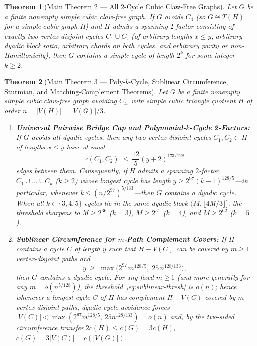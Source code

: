 \documentclass[11pt,reqno]{amsart}
\theoremstyle{plain}
\newtheorem{theorem}{Theorem}[section]
\theoremstyle{definition}
\theoremstyle{remark}
\DeclareRobustCommand{\_}{\ifmmode\text{\textunderscore}\else\textunderscore\allowbreak\fi}
\begin{document}
\begin{theorem}[Main Theorem 2 --- All 2-Cycle Cubic Claw-Free Graphs]\label{thm:main2}
Let $G$ be a finite nonempty simple cubic claw-free graph. If $G$ avoids $C_4$ (so $G \cong T(H)$ for a simple cubic graph $H$) and $H$ admits a spanning $2$-factor consisting of exactly two vertex-disjoint cycles $C_1 \cup C_2$ (of arbitrary lengths $x \le y$, arbitrary dyadic block ratio, arbitrary chords on both cycles, and arbitrary parity or non-Hamiltonicity), then $G$ contains a simple cycle of length $2^k$ for some integer $k \ge 2$.
\end{theorem}

\begin{theorem}[Main Theorem 3 --- Poly-$k$-Cycle, Sublinear Circumference, Sturmian, and Matching-Complement Theorems]\label{thm:main3}
Let $G$ be a finite nonempty simple cubic claw-free graph avoiding $C_4$, with simple cubic triangle quotient $H$ of order $n = |V(H)| = |V(G)|/3$.
\begin{enumerate}[label=(\alph*),leftmargin=2.2em]
  \item \textbf{Universal Pairwise Bridge Cap and Polynomial-$k$-Cycle 2-Factors:} If $G$ avoids all dyadic cycles, then any two vertex-disjoint cycles $C_1, C_2 \subset H$ of lengths $x \le y$ have at most
  \[
    r(C_1, C_2) \;\le\; \frac{12}{5}(y + 2)^{123/128}
  \]
  edges between them. Consequently, if $H$ admits a spanning $2$-factor $C_1 \cup \dots \cup C_k$ ($k \ge 2$) whose longest cycle has length $y \ge 2^{97}(k - 1)^{128/5}$---in particular, whenever $k \le (n/2^{97})^{5/133}$---then $G$ contains a dyadic cycle. When all $k \in \{3, 4, 5\}$ cycles lie in the same dyadic block $(M, \lfloor 4M/3 \rfloor]$, the threshold sharpens to $M \ge 2^{36}$ ($k = 3$), $M \ge 2^{51}$ ($k = 4$), and $M \ge 2^{62}$ ($k = 5$).
  \item \textbf{Sublinear Circumference for $m$-Path Complement Covers:} If $H$ contains a cycle $C$ of length $y$ such that $H - V(C)$ can be covered by $m \ge 1$ vertex-disjoint paths and
  \begin{equation}\label{eq:sublinear-thresh}
    y \;\ge\; \max\!\bigl(2^{97}\, m^{128/5},\; 25\, n^{128/133}\bigr),
  \end{equation}
  then $G$ contains a dyadic cycle. For any fixed $m \ge 1$ (and more generally for any $m = o(n^{5/128})$), the threshold~\eqref{eq:sublinear-thresh} is $o(n)$; hence whenever a longest cycle $C$ of $H$ has complement $H - V(C)$ covered by $m$ vertex-disjoint paths, dyadic-cycle avoidance forces $|V(C)| < \max(2^{97} m^{128/5},\, 25 n^{128/133}) = o(n)$ and, by the two-sided circumference transfer $2 c(H) \le c(G) = 3 c(H)$, $c(G) = 3|V(C)| = o(|V(G)|)$.

\end{enumerate}
\end{theorem}
\end{document}
